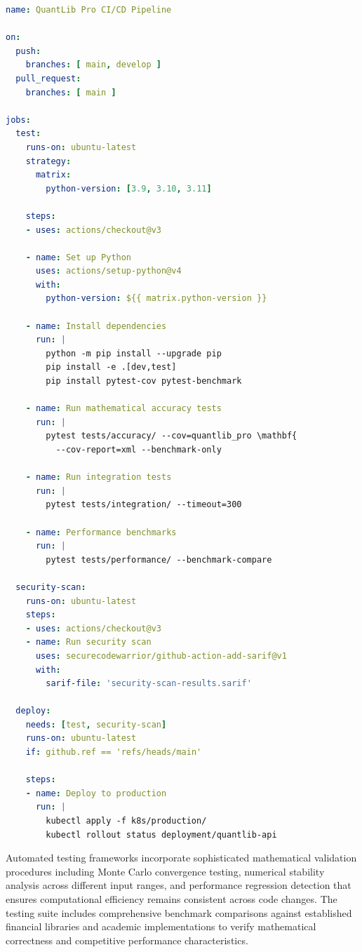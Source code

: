 \documentclass[12pt,a4paper]{article}
\theoremstyle{definition}
\theoremstyle{remark}
\begin{document}
\begin{lstlisting}[caption=CI/CD Pipeline Configuration,language=yaml]
name: QuantLib Pro CI/CD Pipeline

on:
  push:
    branches: [ main, develop ]
  pull_request:
    branches: [ main ]

jobs:
  test:
    runs-on: ubuntu-latest
    strategy:
      matrix:
        python-version: [3.9, 3.10, 3.11]
    
    steps:
    - uses: actions/checkout@v3
    
    - name: Set up Python
      uses: actions/setup-python@v4
      with:
        python-version: ${{ matrix.python-version }}
    
    - name: Install dependencies
      run: |
        python -m pip install --upgrade pip
        pip install -e .[dev,test]
        pip install pytest-cov pytest-benchmark
    
    - name: Run mathematical accuracy tests
      run: |
        pytest tests/accuracy/ --cov=quantlib_pro \mathbf{
          --cov-report=xml --benchmark-only
    
    - name: Run integration tests
      run: |
        pytest tests/integration/ --timeout=300
    
    - name: Performance benchmarks
      run: |
        pytest tests/performance/ --benchmark-compare
  
  security-scan:
    runs-on: ubuntu-latest
    steps:
    - uses: actions/checkout@v3
    - name: Run security scan
      uses: securecodewarrior/github-action-add-sarif@v1
      with:
        sarif-file: 'security-scan-results.sarif'
  
  deploy:
    needs: [test, security-scan]
    runs-on: ubuntu-latest
    if: github.ref == 'refs/heads/main'
    
    steps:
    - name: Deploy to production
      run: |
        kubectl apply -f k8s/production/
        kubectl rollout status deployment/quantlib-api
\end{lstlisting}

Automated testing frameworks incorporate sophisticated mathematical validation procedures including Monte Carlo convergence testing, numerical stability analysis across different input ranges, and performance regression detection that ensures computational efficiency remains consistent across code changes. The testing suite includes comprehensive benchmark comparisons against established financial libraries and academic implementations to verify mathematical correctness and competitive performance characteristics.
\end{document}
